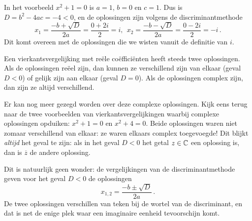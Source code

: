 \documentclass{ximera}
\begin{document}
In het voorbeeld $x^2 + 1 = 0$ is $a = 1$, $b=0$ en $c = 1$. Dus is $D = b^2 - 4ac = -4 < 0$, en de oplossingen zijn volgens de discriminantmethode 
$$
x_1 = \frac{-b + \sqrt{D}}{2a} = \frac{0 + 2i}{2} = i, \ \ x_2 = \frac{-b - \sqrt{D}}{2a} = \frac{0 - 2i}{2} = -i \, .
$$
Dit komt overeen met de oplossingen die we wisten vanuit de definitie van $i$. 


\begin{xmuitweiding}
Een vierkantsvergelijking met reële coëfficiënten heeft steeds twee oplossingen. Als de oplossingen reëel zijn, dan kunnen ze verschillend zijn van elkaar (geval $D < 0$) of gelijk zijn aan elkaar (geval $D = 0$). Als de oplossingen complex zijn, dan zijn ze altijd verschillend.

Er kan nog meer gezegd worden over deze complexe oplossingen. Kijk eens terug naar de twee voorbeelden van vierkantsvergelijkingen waarbij complexe oplossingen opduiken: $x^2 + 1 = 0$ en $x^2 + 4 = 0$. Beide oplossingen waren niet zomaar verschillend van elkaar: ze waren elkaars complex toegevoegde! Dit blijkt \textit{altijd} het geval te zijn: als in het geval $D < 0$ het getal $z \in \mathbb{C}$ een oplossing is, dan is $\overline{z}$ de andere oplossing.

Dit is natuurlijk geen wonder: de vergelijkingen van de discriminantmethode geven voor het geval $D < 0$ de oplossingen
$$
x_{1,2} = \frac{-b \pm \sqrt{D}}{2a} \, .
$$ 
De twee oplossingen verschillen van teken bij de wortel van de discriminant, en dat is net de enige plek waar een imaginaire eenheid tevoorschijn komt. 
\end{xmuitweiding}
\end{document}
